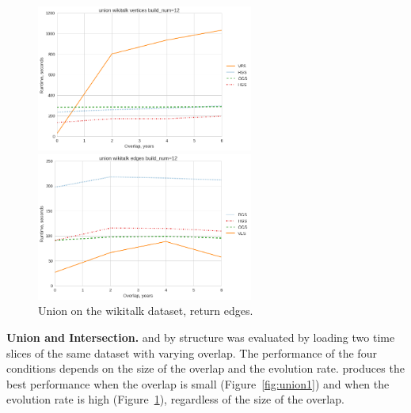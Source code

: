 \begin{figure}[h]
\centering
\begin{minipage}{3.3in}
\centering
\includegraphics[width=2.8in]{figs/union_wikitalk_vertices_build12.png}
\caption{Union on the wikitalk dataset, return vertices.}
\label{fig:union1}
\end{minipage}
\begin{minipage}{3.3in}
\centering
\includegraphics[width=2.8in]{figs/union_wikitalk_edges_build12.png}
\caption{Union on the wikitalk dataset, return edges.}
\label{fig:union2}
\end{minipage}
\end{figure}

{\bf Union and Intersection.}   and 
by structure was evaluated by loading two time slices of the same
dataset with varying overlap.  The performance of the four conditions
depends on the size of the overlap and the evolution rate.  \ve
produces the best performance when the overlap is small
(Figure~\ref{fig:union1}) and when the evolution rate is high
(Figure~\ref{fig:union2}), regardless of the size of the overlap.

